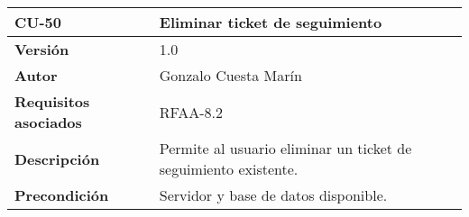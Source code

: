 \begin{longtable}[]{@{}ll@{}}
\toprule
\begin{minipage}[b]{0.24\columnwidth}\raggedright
\textbf{CU-50}\strut
\end{minipage} & \begin{minipage}[b]{0.70\columnwidth}\raggedright
\textbf{Eliminar ticket de seguimiento}\strut
\end{minipage}\tabularnewline
\midrule
\endhead
\begin{minipage}[t]{0.24\columnwidth}\raggedright
\textbf{Versión}\strut
\end{minipage} & \begin{minipage}[t]{0.70\columnwidth}\raggedright
1.0\strut
\end{minipage}\tabularnewline
\begin{minipage}[t]{0.24\columnwidth}\raggedright
\textbf{Autor}\strut
\end{minipage} & \begin{minipage}[t]{0.70\columnwidth}\raggedright
Gonzalo Cuesta Marín\strut
\end{minipage}\tabularnewline
\begin{minipage}[t]{0.24\columnwidth}\raggedright
\textbf{Requisitos asociados}\strut
\end{minipage} & \begin{minipage}[t]{0.70\columnwidth}\raggedright
RFAA-8.2\strut
\end{minipage}\tabularnewline
\begin{minipage}[t]{0.24\columnwidth}\raggedright
\textbf{Descripción}\strut
\end{minipage} & \begin{minipage}[t]{0.70\columnwidth}\raggedright
Permite al usuario eliminar un ticket de seguimiento existente.\strut
\end{minipage}\tabularnewline
\begin{minipage}[t]{0.24\columnwidth}\raggedright
\textbf{Precondición}\strut
\end{minipage} & \begin{minipage}[t]{0.70\columnwidth}\raggedright
Servidor y base de datos disponible.


\end{minipage}
\end{longtable}
